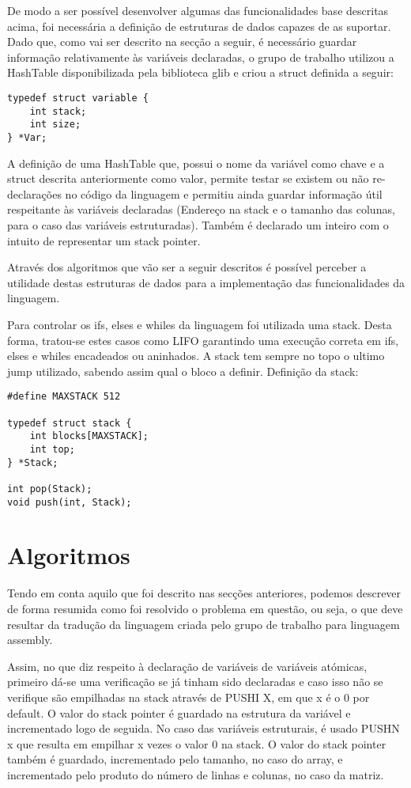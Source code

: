 \documentclass{report}
\begin{document}
De modo a ser possível desenvolver algumas das funcionalidades base descritas acima, foi necessária a definição de estruturas de dados capazes de as suportar. Dado que, como vai ser descrito na secção a seguir, é necessário guardar informação relativamente às variáveis declaradas, o grupo de trabalho utilizou a HashTable disponibilizada pela biblioteca glib e criou a struct definida a seguir: 

\begin{lstlisting}
typedef struct variable {
    int stack;
    int size;
} *Var;
\end{lstlisting}

A definição de uma HashTable que, possui o nome da variável como chave e a struct descrita anteriormente como valor, permite testar se existem ou não re-declarações no código da linguagem e permitiu ainda guardar informação útil respeitante às variáveis declaradas (Endereço na stack e o tamanho das colunas, para o caso das variáveis estruturadas). Também é declarado um inteiro com o intuito de  representar um stack pointer.

Através dos algoritmos que vão ser a seguir descritos é possível perceber a utilidade destas estruturas de dados para a implementação das funcionalidades da linguagem. 

Para controlar os ifs, elses e whiles da linguagem foi utilizada uma stack. Desta forma, tratou-se estes casos como LIFO garantindo 
uma execução correta em ifs, elses e whiles encadeados ou aninhados. A stack tem sempre no topo o ultimo jump utilizado, sabendo assim
qual o bloco a definir. Definição da stack:

\begin{lstlisting}
#define MAXSTACK 512

typedef struct stack {
    int blocks[MAXSTACK];
    int top;
} *Stack;

int pop(Stack);
void push(int, Stack);
\end{lstlisting}


\section{Algoritmos}

Tendo em conta aquilo que foi descrito nas secções anteriores, podemos descrever de forma resumida como foi resolvido o problema em questão, ou seja, o que deve resultar da tradução da linguagem criada pelo  grupo de trabalho para linguagem assembly.  

Assim, no que diz respeito à declaração de variáveis de variáveis atómicas, primeiro dá-se uma verificação se já tinham sido declaradas e caso isso não se verifique são empilhadas na stack através de PUSHI X, em que x é o 0 por default. O valor do stack pointer é guardado na estrutura da variável e incrementado logo de seguida. No caso das variáveis estruturais, é usado PUSHN x que resulta em empilhar x vezes o valor 0 na stack.  O valor do stack pointer também é guardado, incrementado pelo tamanho, no caso do array, e incrementado pelo produto do número de linhas e colunas, no caso da matriz. 
\end{document}
